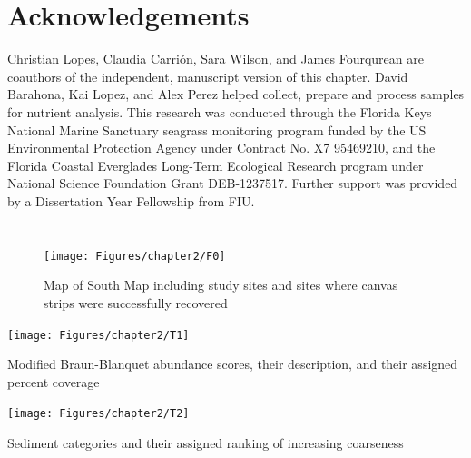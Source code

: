 \section{Acknowledgements}

Christian Lopes, Claudia Carrión, Sara Wilson, and James Fourqurean are coauthors of the independent, manuscript version of this chapter. David Barahona, Kai Lopez, and Alex Perez helped collect, prepare and process samples for nutrient analysis. This research was conducted through the Florida Keys National Marine Sanctuary seagrass monitoring program funded by the US Environmental Protection Agency under Contract No. X7 95469210, and the Florida Coastal Everglades Long-Term Ecological Research program under National Science Foundation Grant DEB-1237517. Further support was provided by a Dissertation Year Fellowship from FIU.

\section{}
\begingroup
\setlength{\bibsep}{10pt}
\linespread{1}\selectfont


\renewcommand{\section}[2]{}%


\endgroup
\newpage

\begin{figure}[t]
  \centering
   \texttt{[image: Figures/chapter2/F0]}
\caption[Regional map including sites]{Map of South Map including study sites and sites where canvas strips were successfully recovered}
  \label{fig:2F0}
\end{figure}

\begin{table}[t]
  \centering
  \texttt{[image: Figures/chapter2/T1]}
\caption[Description of modified Braun-Blanquet abundance scores]{Modified Braun-Blanquet abundance scores, their description, and their assigned percent coverage}
  \label{table:2T1}
\end{table}


\begin{table}[t]
  \centering
  \texttt{[image: Figures/chapter2/T2]}
\caption[Sediment categories and their assigned ranking of increasing coarseness]{Sediment categories and their assigned ranking of increasing coarseness}
  \label{table:2T2}
\end{table}


